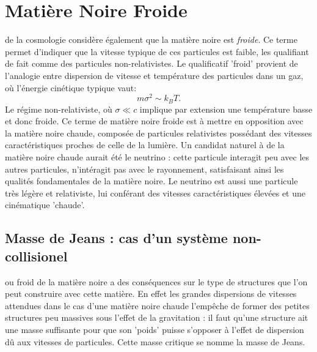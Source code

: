 \section{Matière Noire Froide}

 de la cosmologie considère également que la matière noire est \textit{froide}. Ce terme permet d'indiquer que la vitesse typique de ces particules est faible, les qualifiant de fait comme des particules non-relativistes. Le qualificatif 'froid' provient de l'analogie entre dispersion de vitesse et température des particules dans un gaz, où l'énergie cinétique typique vaut:
\begin{equation}
m\sigma^2 \sim k_B T.
\end{equation}
Le régime non-relativiste, où $\sigma \ll c$ implique par extension une température basse et donc froide. Ce terme de matière noire froide est à mettre en opposition avec la matière noire chaude, composée de particules relativistes possédant des vitesses caractéristiques proches de celle de la lumière. Un candidat naturel à de la matière noire chaude aurait été le neutrino : cette particule interagit peu avec les autres particules, n'intéragit pas avec le rayonnement, satisfaisant ainsi les qualités fondamentales de la matière noire. Le neutrino est aussi une particule très légère et relativiste, lui conférant des vitesses caractéristiques élevées et une cinématique 'chaude'.

\subsection{Masse de Jeans : cas d'un système non-collisionel}
 ou froid de la matière noire a des conséquences sur le type de structures que l'on peut construire avec cette matière. En effet les grandes dispersions de vitesses attendues dans le cas d'une matière noire chaude l'empêche de former des petites structures peu massives sous l'effet de la gravitation : il faut qu'une structure ait une masse suffisante pour que son 'poids' puisse s'opposer à l'effet de dispersion dû aux vitesses de particules. Cette masse critique se nomme la masse de Jeans.

